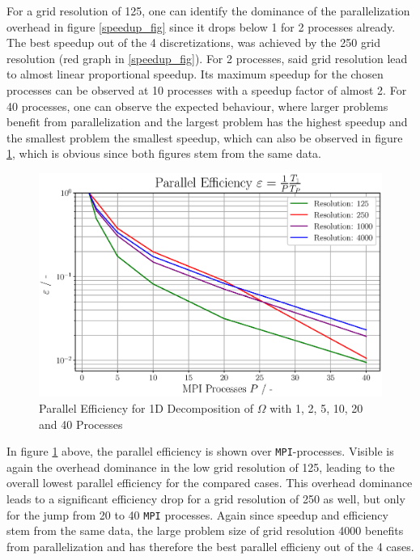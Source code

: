 For a grid resolution of 125, one can identify the dominance of the parallelization overhead in figure \ref*{speedup_fig} since it drops below 1 for 2 processes already.
The best speedup out of the 4 discretizations, was achieved by the 250 grid resolution (red graph in \ref*{speedup_fig}).
For 2 processes, said grid resolution lead to almost linear proportional speedup. Its maximum speedup for the chosen processes can be observed
at 10 processes with a speedup factor of almost 2. For 40 processes, one can observe the expected behaviour, where larger problems benefit from parallelization
and the largest problem has the highest speedup and the smallest problem the smallest speedup, which can also be observed in figure \ref*{efficiency_fig},
which is obvious since both figures stem from the same data.

\pagebreak

\begin{figure}[ht]
	\centering
    \includegraphics[width=1\textwidth]{figures/epsilon_semilogy.eps}
	\caption{Parallel Efficiency for 1D Decomposition of $\Omega$ with 1, 2, 5, 10, 20 and 40 Processes}
    \label{efficiency_fig}
\end{figure}

In figure \ref*{efficiency_fig} above, the parallel efficiency is shown over \texttt{MPI}-processes.
Visible is again the overhead dominance in the low grid resolution of 125, leading to the overall lowest parallel efficiency for the compared cases.
This overhead dominance leads to a significant efficiency drop for a grid resolution of 250 as well, but only for the jump from 20 to 40 \texttt{MPI} processes.
Again since speedup and efficiency stem from the same data, the large problem size of grid resolution 4000 benefits from parallelization and
has therefore the best parallel efficieny out of the 4 cases.



